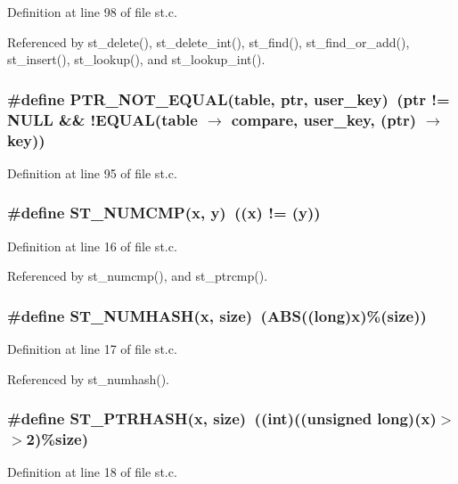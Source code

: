 Definition at line 98 of file st.c.

Referenced by st\_\-delete(), st\_\-delete\_\-int(), st\_\-find(), st\_\-find\_\-or\_\-add(), st\_\-insert(), st\_\-lookup(), and st\_\-lookup\_\-int().
\subsubsection{\setlength{\rightskip}{0pt plus 5cm}\#define PTR\_\-NOT\_\-EQUAL(table, ptr, user\_\-key)~(ptr != NULL \&\& !EQUAL(table $\rightarrow$ compare, user\_\-key, (ptr) $\rightarrow$ key))}\label{st_8c_dc63a1b1f02f0b457c85154dc513d626}




Definition at line 95 of file st.c.
\subsubsection{\setlength{\rightskip}{0pt plus 5cm}\#define ST\_\-NUMCMP(x, y)~((x) != (y))}\label{st_8c_2796b8bc2a5f15834d61a3519ad149d5}




Definition at line 16 of file st.c.

Referenced by st\_\-numcmp(), and st\_\-ptrcmp().
\subsubsection{\setlength{\rightskip}{0pt plus 5cm}\#define ST\_\-NUMHASH(x, \bf{size})~(ABS((long)x)\%(\bf{size}))}\label{st_8c_76573cced143d429f99bfb5e286c621e}




Definition at line 17 of file st.c.

Referenced by st\_\-numhash().
\subsubsection{\setlength{\rightskip}{0pt plus 5cm}\#define ST\_\-PTRHASH(x, \bf{size})~((int)((unsigned long)(x)$>$$>$2)\%\bf{size})}\label{st_8c_524a1efaf5df2432aa5bf96e35546164}




Definition at line 18 of file st.c.

